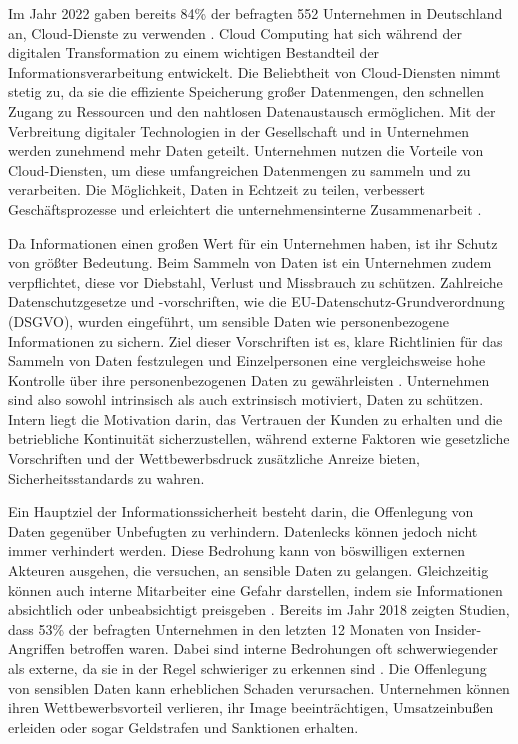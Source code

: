 Im Jahr 2022 gaben bereits 84\% der befragten 552 Unternehmen in Deutschland an, Cloud-Dienste zu verwenden \cite{KPMG.2022}. Cloud Computing hat sich während der digitalen Transformation zu einem wichtigen Bestandteil der Informationsverarbeitung entwickelt. Die Beliebtheit von Cloud-Diensten nimmt stetig zu, da sie die effiziente Speicherung großer Datenmengen, den schnellen Zugang zu Ressourcen und den nahtlosen Datenaustausch ermöglichen. Mit der Verbreitung digitaler Technologien in der Gesellschaft und in Unternehmen werden zunehmend mehr Daten geteilt. Unternehmen nutzen die Vorteile von Cloud-Diensten, um diese umfangreichen Datenmengen zu sammeln und zu verarbeiten. Die Möglichkeit, Daten in Echtzeit zu teilen, verbessert Geschäftsprozesse und erleichtert die unternehmensinterne Zusammenarbeit \cite{Surianarayanan.2023b}. %

Da Informationen einen großen Wert für ein Unternehmen haben, ist ihr Schutz von größter Bedeutung. Beim Sammeln von Daten ist ein Unternehmen zudem verpflichtet, diese vor Diebstahl, Verlust und Missbrauch zu schützen. Zahlreiche Datenschutzgesetze und -vorschriften, wie die EU-Datenschutz-Grundverordnung (DSGVO), wurden eingeführt, um sensible Daten wie personenbezogene Informationen zu sichern. Ziel dieser Vorschriften ist es, klare Richtlinien für das Sammeln von Daten festzulegen und Einzelpersonen eine vergleichsweise hohe Kontrolle über ihre personenbezogenen Daten zu gewährleisten \cite{Kuzina.2023}. %
Unternehmen sind also sowohl intrinsisch als auch extrinsisch motiviert, Daten zu schützen. Intern liegt die Motivation darin, das Vertrauen der Kunden zu erhalten und die betriebliche Kontinuität sicherzustellen, während externe Faktoren wie gesetzliche Vorschriften und der Wettbewerbsdruck zusätzliche Anreize bieten, Sicherheitsstandards zu wahren.

Ein Hauptziel der Informationssicherheit besteht darin, die Offenlegung von Daten gegenüber Unbefugten zu verhindern. Datenlecks können jedoch nicht immer verhindert werden. Diese Bedrohung kann von böswilligen externen Akteuren ausgehen, die versuchen, an sensible Daten zu gelangen. Gleichzeitig können auch interne Mitarbeiter eine Gefahr darstellen, indem sie Informationen absichtlich oder unbeabsichtigt preisgeben  \cite{Alneyadi.2016}. Bereits im Jahr 2018 zeigten Studien, dass 53\% der befragten Unternehmen in den letzten 12 Monaten von Insider-Angriffen betroffen waren. Dabei sind interne Bedrohungen oft schwerwiegender als externe, da sie in der Regel schwieriger zu erkennen sind \cite{CATechnologies.2018}.
Die Offenlegung von sensiblen Daten kann erheblichen Schaden verursachen. Unternehmen können ihren Wettbewerbsvorteil verlieren, ihr Image beeinträchtigen, Umsatzeinbußen erleiden oder sogar Geldstrafen und Sanktionen erhalten.

